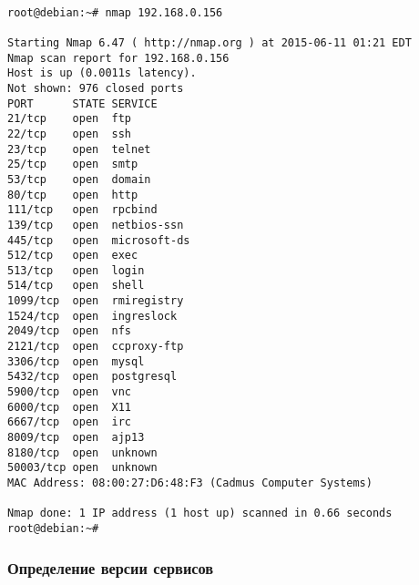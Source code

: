 \documentclass[10pt,a4paper]{article}
\begin{document}
\begin{verbatim}

root@debian:~# nmap 192.168.0.156

Starting Nmap 6.47 ( http://nmap.org ) at 2015-06-11 01:21 EDT
Nmap scan report for 192.168.0.156
Host is up (0.0011s latency).
Not shown: 976 closed ports
PORT      STATE SERVICE
21/tcp    open  ftp
22/tcp    open  ssh
23/tcp    open  telnet
25/tcp    open  smtp
53/tcp    open  domain
80/tcp    open  http
111/tcp   open  rpcbind
139/tcp   open  netbios-ssn
445/tcp   open  microsoft-ds
512/tcp   open  exec
513/tcp   open  login
514/tcp   open  shell
1099/tcp  open  rmiregistry
1524/tcp  open  ingreslock
2049/tcp  open  nfs
2121/tcp  open  ccproxy-ftp
3306/tcp  open  mysql
5432/tcp  open  postgresql
5900/tcp  open  vnc
6000/tcp  open  X11
6667/tcp  open  irc
8009/tcp  open  ajp13
8180/tcp  open  unknown
50003/tcp open  unknown
MAC Address: 08:00:27:D6:48:F3 (Cadmus Computer Systems)

Nmap done: 1 IP address (1 host up) scanned in 0.66 seconds
root@debian:~# 

\end{verbatim}

\subsubsection{Определение версии сервисов}
\end{document}
